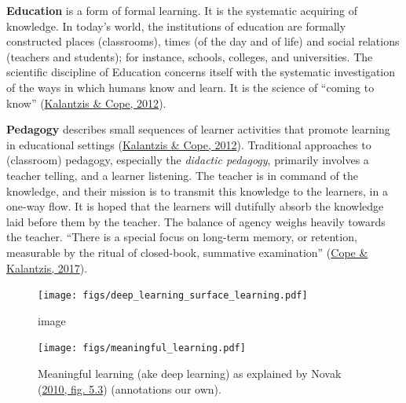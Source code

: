 \documentclass[a4paper, nobind]{templates/ociamthesis}
\begin{document}
\textbf{Education} is a form of formal learning. It is the systematic
acquiring of knowledge. In today's world, the institutions of education
are formally constructed places (classrooms), times (of the day and of
life) and social relations (teachers and students); for instance,
schools, colleges, and universities. The scientific discipline of
Education concerns itself with the systematic investigation of the ways
in which humans know and learn. It is the science of ``coming to know''
(\protect\hyperlink{ref-kalantzis2012newa}{Kalantzis \& Cope, 2012}).

\textbf{Pedagogy} describes small sequences of learner activities that
promote learning in educational settings (\protect\hyperlink{ref-kalantzis2012newa}{Kalantzis \& Cope, 2012}).
Traditional approaches to (classroom) pedagogy, especially the \emph{didactic
pedagogy}, primarily involves a teacher telling, and a learner
listening. The teacher is in command of the knowledge, and their mission
is to transmit this knowledge to the learners, in a one-way flow. It is
hoped that the learners will dutifully absorb the knowledge laid before
them by the teacher. The balance of agency weighs heavily towards the
teacher. ``There is a special focus on long-term memory, or retention,
measurable by the ritual of closed-book, summative examination''
(\protect\hyperlink{ref-cope2017elearningc}{Cope \& Kalantzis, 2017}).

\begin{figure}
\centering
\texttt{[image: figs/deep\_learning\_surface\_learning.pdf]}
\caption{image}
\end{figure}

\begin{figure}
\hypertarget{fig_meaningful_learning}{%
\centering
\texttt{[image: figs/meaningful\_learning.pdf]}
\caption{Meaningful learning (ake deep learning) as explained by
Novak (\protect\hyperlink{ref-novak2010learninga}{2010, fig. 5.3}) (annotations our own).}\label{fig_meaningful_learning}
}
\end{figure}
\end{document}
